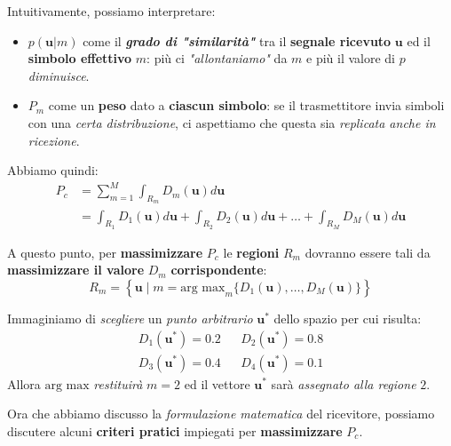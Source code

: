 \begin{remark}
    Intuitivamente, possiamo interpretare:
    \begin{itemize}
        \item $p(\mathbf{u}|m)$ come il \textbf{\textit{grado di "similarità"}} 
            tra il \textbf{segnale ricevuto} $\mathbf{u}$ ed il \textbf{simbolo effettivo} $m$:
            più ci \textit{"allontaniamo"} da $m$ e più il valore di $p$ \textit{diminuisce}.
        \item $P_m$ come un \textbf{peso} dato a \textbf{ciascun simbolo}: se il trasmettitore
            invia simboli con una \textit{certa distribuzione}, ci aspettiamo che questa
            sia \textit{replicata anche in ricezione}.
    \end{itemize}
\end{remark}

Abbiamo quindi:
\[
    \begin{aligned}
        P_c &= \sum_{m=1}^M \int_{R_m} D_m(\mathbf{u}) d\mathbf{u} \\ 
            &= \int_{R_1} D_1(\mathbf{u}) d\mathbf{u} + \int_{R_2} D_2(\mathbf{u}) d\mathbf{u} +
            \ldots + \int_{R_M} D_M(\mathbf{u}) d\mathbf{u}
    \end{aligned}
\]

A questo punto, per \textbf{massimizzare} $P_c$ le \textbf{regioni} $R_m$ dovranno essere 
tali da \textbf{massimizzare il valore} $D_m$ \textbf{corrispondente}:
\[
    R_m = \left\{ \mathbf{u} \;|\; m = 
    \text{arg max}_m \{ D_{1}(\mathbf{u}),\ldots , D_M(\mathbf{u}) \} \right\}  
\]

\begin{exa}
    Immaginiamo di \textit{scegliere} un \textit{punto arbitrario} $\mathbf{u}^*$ 
    dello spazio per cui risulta:
    \[
        \begin{aligned}
            D_{1}(\mathbf{u}^*) = 0.2 & & D_{2}(\mathbf{u}^*) = 0.8 \\
            D_{3}(\mathbf{u}^*) = 0.4 & & D_{4}(\mathbf{u}^*) = 0.1
        \end{aligned}
    \] 
    Allora $\text{arg max}$ \textit{restituirà} $m=2$ ed il vettore
    $\mathbf{u}^*$ sarà \textit{assegnato alla regione} $2$.
\end{exa}

Ora che abbiamo discusso la \textit{formulazione matematica} del ricevitore, 
possiamo discutere alcuni \textbf{criteri pratici} impiegati per
\textbf{massimizzare} $P_c$.

